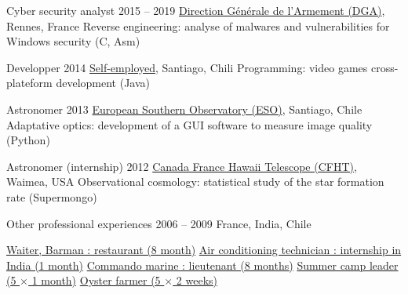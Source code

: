 \begin{joblist}[12.8][8.4][4]

\setlength{\parskip}{0.3cm}
\vspace{-0.4cm}

\item[Cyber security analyst]{2015 -- 2019}
  {
  \href{http://www.defense.gouv.fr/dga/}{Direction Générale de l'Armement (DGA)}, Rennes, France
  }
  {Reverse engineering: analyse of malwares and vulnerabilities for Windows security (C, Asm)}


\item[Developper]{2014}
  {
  \tbfihuman
  \href{https://tinmarino.github.io/page/}{Self-employed}, Santiago, Chili
  }
  {Programming: video games cross-plateform development (Java)}


\item[Astronomer]{2013}
  {
  \href{http://www.eso.org/public/}{European Southern Observatory (ESO)}, Santiago, Chile
  }
  {Adaptative optics: development of a GUI software to measure image quality (Python)}


\item[Astronomer (internship)]{2012}
  {
  \href{https://www.cfht.hawaii.edu/}{Canada France Hawaii Telescope (CFHT)}, Waimea, USA
  }
  {Observational cosmology: statistical study of the star formation rate (Supermongo)}


\item[Other professional experiences]{2006 -- 2009}
  {
  France, India, Chile
  }
  {
    \renewcommand\labelitemi{{}}
    \vspace{-0.8cm}
    \setlength{\parskip}{0cm}
    \begin{itemize}
    \setlength\itemsep{0cm}

    \cvitem \href{http://www.insertcoin.cl/}{\tbfiic Waiter, Barman : restaurant (8 month)}
    \cvitem \href{http://www.dupont.co.in/}{ Air conditioning technician : internship in India (1 month)}
    \cvitem \href{http://www.defense.gouv.fr/marine/organisation/forces/fusiliers-marins-et-commandos/force-maritime-des-fusiliers-marins-et-commandos}{ Commando marine : lieutenant (8 months)}
    \cvitem \href{http://www.vacances-pour-tous.org/}{ Summer camp leader (5 $\times$ 1 month)}
    \cvitem \href{http://huitresdesaintvaast.fr/}{\tbfioyster Oyster farmer (5 $\times$ 2 weeks)}
    \end{itemize}
  }

\end{joblist}


\ifx\HCode\undefined
\else
    \maketitle
\fi




